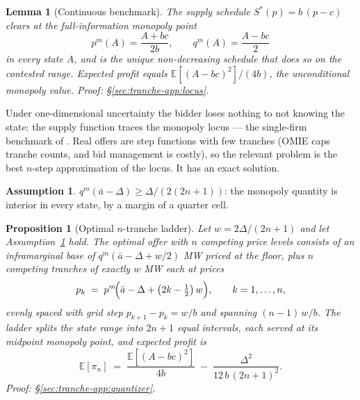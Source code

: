 \documentclass[11pt,a4paper]{article}
\newtheorem{proposition}{Proposition}
\newtheorem{lemma}{Lemma}
\theoremstyle{definition}
\newtheorem{assumption}{Assumption}
\theoremstyle{remark}
\theoremstyle{plain}
\begin{document}
\begin{lemma}[Continuous benchmark]\label{lem:locus}
The supply schedule $S^*(p) = b\,(p - c)$ clears at the full-information monopoly point
\[
p^m(A) = \frac{A + bc}{2b}, \qquad q^m(A) = \frac{A - bc}{2}
\]
in every state $A$, and is the unique non-decreasing schedule that does so on the contested range. Expected profit equals $\mathbb{E}[(A - bc)^2]/(4b)$, the unconditional monopoly value. \emph{Proof: \S\ref{sec:tranche-app:locus}.}
\end{lemma}

Under one-dimensional uncertainty the bidder loses nothing to not knowing the state: the supply function traces the monopoly locus --- the single-firm benchmark of \citet{klemperer_meyer_1989}. Real offers are step functions with few tranches (OMIE caps tranche counts, and bid management is costly), so the relevant problem is the best $n$-step approximation of the locus. It has an exact solution.

\begin{assumption}\label{ass:interior}
$q^m(\bar a - \Delta) \ge \Delta/(2(2n+1))$: the monopoly quantity is interior in every state, by a margin of a quarter cell.
\end{assumption}

\begin{proposition}[Optimal $n$-tranche ladder]\label{prop:ladder}
Let $w = 2\Delta/(2n+1)$ and let Assumption~\ref{ass:interior} hold. The optimal offer with $n$ competing price levels consists of an inframarginal base of $q^m(\bar a - \Delta + w/2)$ MW priced at the floor, plus $n$ competing tranches of exactly $w$ MW each at prices
\[
p_k \;=\; p^m\!\Bigl(\bar a - \Delta + \bigl(2k - \tfrac{1}{2}\bigr)\,w\Bigr), \qquad k = 1, \dots, n,
\]
evenly spaced with grid step $p_{k+1} - p_k = w/b$ and spanning $(n-1)\,w/b$. The ladder splits the state range into $2n+1$ equal intervals, each served at its midpoint monopoly point, and expected profit is
\[
\mathbb{E}[\pi_n] \;=\; \frac{\mathbb{E}[(A - bc)^2]}{4b} \;-\; \frac{\Delta^2}{12\, b\, (2n+1)^2}.
\]
\emph{Proof: \S\ref{sec:tranche-app:quantizer}.}
\end{proposition}
\end{document}
